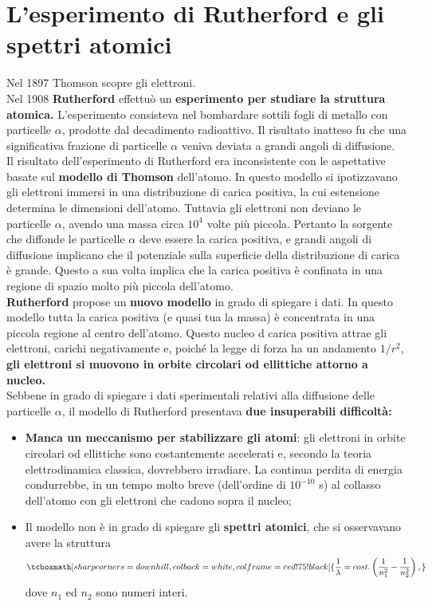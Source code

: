 \section{L'esperimento di Rutherford e gli spettri atomici}
Nel 1897 Thomson scopre gli elettroni.\\
Nel 1908 \textbf{Rutherford} effettuò un \textbf{esperimento per studiare la struttura atomica.} L'esperimento consisteva nel bombardare sottili fogli di metallo con particelle $\alpha$, prodotte dal decadimento radioattivo. Il risultato inatteso fu che una significativa frazione di particelle $\alpha$ veniva deviata a grandi angoli di diffusione.\\
Il risultato dell'esperimento di Rutherford era inconsistente con le aspettative basate sul \textbf{modello di Thomson} dell'atomo. In questo modello si ipotizzavano gli elettroni immersi in una distribuzione di carica positiva, la cui estensione determina le dimensioni dell'atomo. Tuttavia gli elettroni non deviano le particelle $\alpha$, avendo una massa circa $10^4$ volte più piccola. Pertanto la sorgente che diffonde le particelle $\alpha$ deve essere la carica positiva, e grandi angoli di diffusione implicano che il potenziale sulla superficie della distribuzione di carica è grande. Questo a sua volta implica che la carica positiva è confinata in una regione di spazio molto più piccola dell'atomo.\\
\textbf{Rutherford} propose un \textbf{nuovo modello} in grado di spiegare i dati. In questo modello tutta la carica positiva (e quasi tua la massa) è concentrata in una piccola regione al centro dell'atomo. Questo nucleo d carica positiva attrae gli elettroni, carichi negativamente e, poiché la legge di forza ha un andamento $1/r^2$, \textbf{gli elettroni si muovono in orbite circolari od ellittiche attorno a nucleo.}\\
Sebbene in grado di spiegare i dati sperimentali relativi alla diffusione delle particelle $\alpha$, il modello di Rutherford presentava \textbf{due insuperabili difficoltà:}
	\begin{itemize}
		\item \textbf{Manca un meccanismo per stabilizzare gli atomi}: gli elettroni in orbite circolari od ellittiche sono costantemente accelerati e, secondo la teoria elettrodinamica classica, dovrebbero irradiare. La continua perdita di energia condurrebbe, in un tempo molto breve (dell'ordine di $10^{-10}$ s) al collasso dell'atomo con gli elettroni che cadono sopra il nucleo;
		\item Il modello non è in grado di spiegare gli \textbf{spettri atomici}, che si osservavano avere la struttura
			\begin{equation}
				\tcboxmath[sharp corners=downhill ,colback=white,colframe=red!75!black]{
					\frac{1}{\lambda} = cost. \left( \frac{1}{n_1 ^2}-\frac{1}{n_2 ^2} \right),
					}
			\end{equation}
		dove $n_1$ ed $n_2$ sono numeri interi.
\end{itemize}

